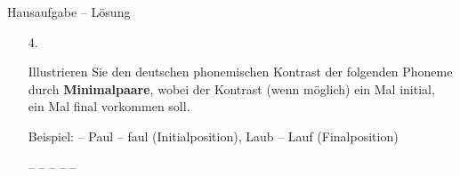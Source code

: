 \begin{frame}{Hausaufgabe -- Lösung}

\begin{itemize}	
\item[4.]{Illustrieren  Sie den deutschen phonemischen Kontrast der folgenden Phoneme durch \textbf{Minimalpaare}, wobei der Kontrast (wenn möglich) ein Mal initial,\\ ein Mal final vorkommen soll.

Beispiel: \textipa{[p]} -- \textipa{[f]} Paul -- faul (Initialposition), Laub -- Lauf (Finalposition)}

\begin{exe}
	\settowidth{}
	\begin{xlist}
		\ex \textipa{[m]} -- \textipa{[n]} 
		\ex \textipa{[p]} -- \textipa{[b]} 
		\ex \textipa{[h]} -- \textipa{[v]} 
		\ex \textipa{[n]} -- \textipa{[N]} 
		\ex \textipa{[f]} -- \textipa{[v]} 
	\end{xlist}
\end{exe}
		
\end{itemize}

\end{frame}
